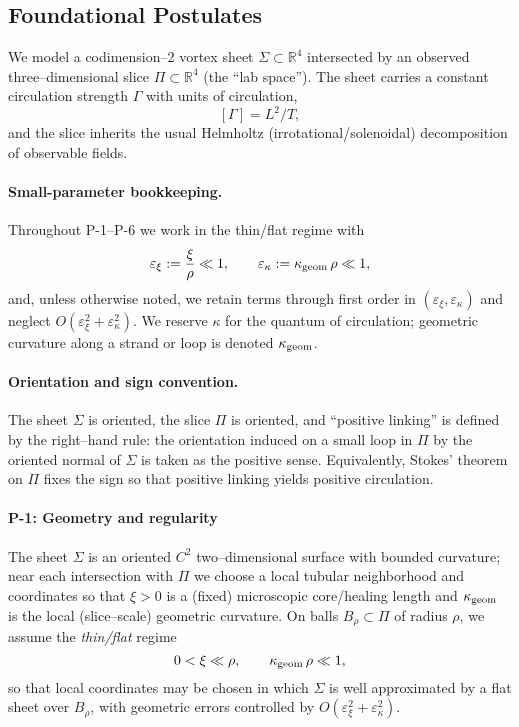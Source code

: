 \subsection{Foundational Postulates}
\label{sec:foundational-postulates}

We model a codimension–2 vortex sheet $\Sigma\subset\mathbb{R}^4$ intersected by an observed three–dimensional slice $\Pi\subset\mathbb{R}^4$ (the ``lab space''). The sheet carries a constant circulation strength $\Gamma$ with units of circulation,
\[
[\Gamma]=L^2/T,
\]
and the slice inherits the usual Helmholtz (irrotational/solenoidal) decomposition of observable fields.

\paragraph*{Small-parameter bookkeeping.}
Throughout P-1–P-6 we work in the thin/flat regime with
\[
\varepsilon_\xi := \frac{\xi}{\rho}\ll 1,\qquad
\varepsilon_\kappa := \kappa_{\rm geom}\,\rho \ll 1,
\]
and, unless otherwise noted, we retain terms through first order in $(\varepsilon_\xi,\varepsilon_\kappa)$ and neglect $O(\varepsilon_\xi^2+\varepsilon_\kappa^2)$.
We reserve $\kappa$ for the quantum of circulation; geometric curvature along a strand or loop is denoted $\kappa_{\rm geom}$.

\paragraph*{Orientation and sign convention.}
The sheet $\Sigma$ is oriented, the slice $\Pi$ is oriented, and ``positive linking'' is defined by the right–hand rule: the orientation induced on a small loop in $\Pi$ by the oriented normal of $\Sigma$ is taken as the positive sense. Equivalently, Stokes' theorem on $\Pi$ fixes the sign so that positive linking yields positive circulation.

\paragraph{P-1: Geometry and regularity}
\label{post:P1}
The sheet $\Sigma$ is an oriented $C^2$ two–dimensional surface with bounded curvature; near each intersection with $\Pi$ we choose a local tubular neighborhood and coordinates so that $\xi>0$ is a (fixed) microscopic core/healing length and $\kappa_{\rm geom}$ is the local (slice–scale) geometric curvature. On balls $B_\rho\subset\Pi$ of radius $\rho$, we assume the \emph{thin/flat} regime
\[
0<\xi \ll \rho, \qquad \kappa_{\rm geom}\,\rho \ll 1,
\]
so that local coordinates may be chosen in which $\Sigma$ is well approximated by a flat sheet over $B_\rho$, with geometric errors controlled by $O(\varepsilon_\xi^2+\varepsilon_\kappa^2)$.

